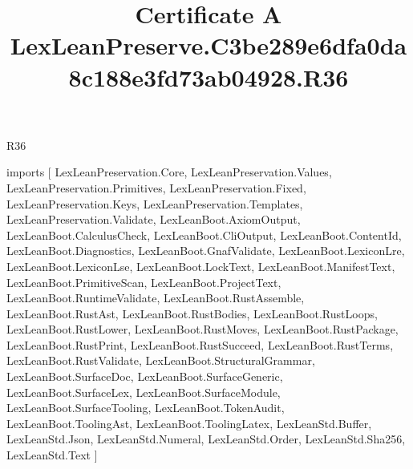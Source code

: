 \begin{lexlean}{R36}
\title{Certificate A LexLeanPreserve.C3be289e6dfa0da8c188e3fd73ab04928.R36}
\begin{coremodule}
imports [
  LexLeanPreservation.Core,
  LexLeanPreservation.Values,
  LexLeanPreservation.Primitives,
  LexLeanPreservation.Fixed,
  LexLeanPreservation.Keys,
  LexLeanPreservation.Templates,
  LexLeanPreservation.Validate,
  LexLeanBoot.AxiomOutput,
  LexLeanBoot.CalculusCheck,
  LexLeanBoot.CliOutput,
  LexLeanBoot.ContentId,
  LexLeanBoot.Diagnostics,
  LexLeanBoot.GnafValidate,
  LexLeanBoot.LexiconLre,
  LexLeanBoot.LexiconLse,
  LexLeanBoot.LockText,
  LexLeanBoot.ManifestText,
  LexLeanBoot.PrimitiveScan,
  LexLeanBoot.ProjectText,
  LexLeanBoot.RuntimeValidate,
  LexLeanBoot.RustAssemble,
  LexLeanBoot.RustAst,
  LexLeanBoot.RustBodies,
  LexLeanBoot.RustLoops,
  LexLeanBoot.RustLower,
  LexLeanBoot.RustMoves,
  LexLeanBoot.RustPackage,
  LexLeanBoot.RustPrint,
  LexLeanBoot.RustSucceed,
  LexLeanBoot.RustTerms,
  LexLeanBoot.RustValidate,
  LexLeanBoot.StructuralGrammar,
  LexLeanBoot.SurfaceDoc,
  LexLeanBoot.SurfaceGeneric,
  LexLeanBoot.SurfaceLex,
  LexLeanBoot.SurfaceModule,
  LexLeanBoot.SurfaceTooling,
  LexLeanBoot.TokenAudit,
  LexLeanBoot.ToolingAst,
  LexLeanBoot.ToolingLatex,
  LexLeanStd.Buffer,
  LexLeanStd.Json,
  LexLeanStd.Numeral,
  LexLeanStd.Order,
  LexLeanStd.Sha256,
  LexLeanStd.Text
]


\end{coremodule}
\end{lexlean}

